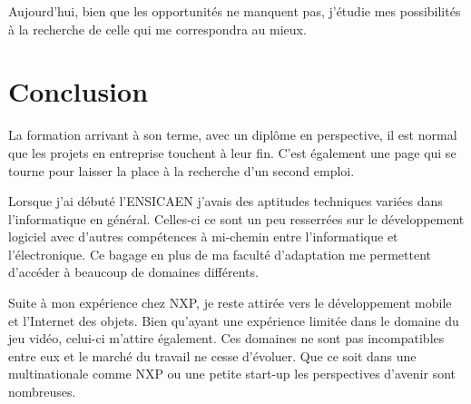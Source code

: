 \documentclass[french,12pt,a4paper,titlepage,openright,openbib]{report}
\begin{document}
Aujourd'hui, bien que les opportunités ne manquent pas, j'étudie mes possibilités à la recherche de celle qui me correspondra au mieux. 

\chapter{Conclusion}

La formation arrivant à son terme, avec un diplôme en perspective, il est normal que les projets en entreprise touchent à leur fin. C'est également une page qui se tourne pour laisser la place à la recherche d'un second emploi.

Lorsque j'ai débuté l'ENSICAEN j'avais des aptitudes techniques variées dans l'informatique en général. Celles-ci ce sont un peu resserrées sur le développement logiciel avec d'autres compétences à mi-chemin entre l'informatique et l'électronique. Ce bagage en plus de ma faculté d'adaptation me permettent d'accéder à beaucoup de domaines différents.

Suite à mon expérience chez NXP, je reste attirée vers le développement mobile et l'Internet des objets. Bien qu'ayant une expérience limitée dans le domaine du jeu vidéo, celui-ci m'attire également. Ces domaines ne sont pas incompatibles entre eux et le marché du travail ne cesse d'évoluer. Que ce soit dans une multinationale comme NXP ou une petite start-up les perspectives d'avenir sont nombreuses.


\printglossary[title={Glossaire}]

{}

	
\end{document}
